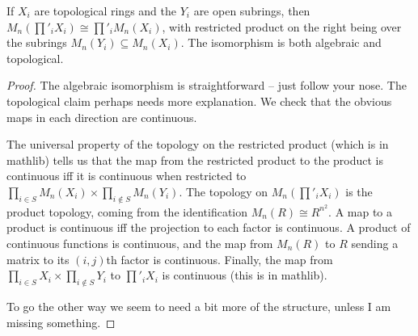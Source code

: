 \begin{lemma} If $X_i$ are topological rings and the $Y_i$ are open subrings,
  then $M_n(\prod'_iX_i)\cong \prod'_iM_n(X_i)$, with restricted product
  on the right being over the subrings $M_n(Y_i)\subseteq M_n(X_i)$. The isomorphism
  is both algebraic and topological.
\end{lemma}
\begin{proof} The algebraic isomorphism is straightforward -- just follow your nose.
  The topological claim perhaps needs more explanation. We check that the obvious
  maps in each direction are continuous.

  The universal property of the topology on the restricted product (which is in
  mathlib) tells us that
  the map from the restricted product to the product is continuous iff it is continuous
  when restricted to $\prod_{i\in S}M_n(X_i)\times\prod_{i\notin S}M_n(Y_i)$.
  The topology on $M_n(\prod'_iX_i)$
  is the product topology, coming from the identification $M_n(R)\cong R^{n^2}$.
  A map to a product is continuous iff the projection to each factor is continuous.
  A product of continuous functions is continuous, and the map from $M_n(R)$ to $R$
  sending a matrix to its $(i,j)$th factor is continuous. Finally, the map from
  $\prod_{i\in S}X_i\times\prod_{i\notin S}Y_i$ to $\prod'_i X_i$ is continuous
  (this is in mathlib).

  To go the other way we seem to need a bit more of the structure, unless I am
  missing something.
\end{proof}
